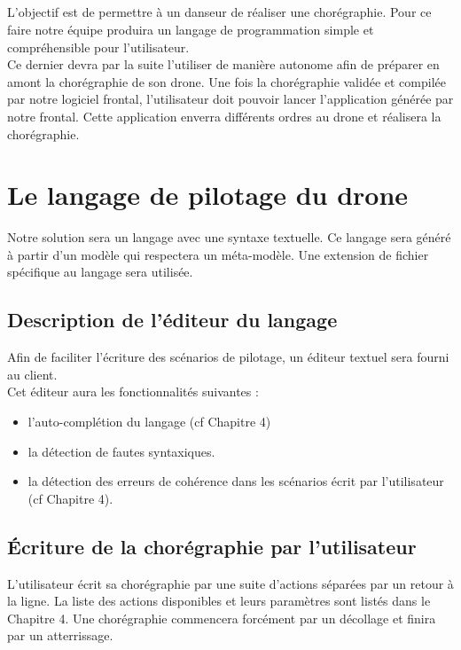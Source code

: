 \documentclass[12pt, openany]{report}
\begin{document}
\paragraph{} L'objectif est de permettre à un danseur de réaliser une chorégraphie. Pour ce faire notre équipe produira un langage de programmation simple et compréhensible pour l'utilisateur. \\Ce dernier devra par la suite l'utiliser de manière autonome afin de préparer en amont la chorégraphie de son drone. Une fois la chorégraphie validée et compilée par notre logiciel frontal, l'utilisateur doit pouvoir lancer l'application générée par notre frontal. Cette application enverra différents ordres au drone et réalisera la chorégraphie.

\chapter{Le langage de pilotage du drone}

Notre solution sera un langage avec une syntaxe textuelle. Ce langage sera généré à partir d'un modèle qui respectera un méta-modèle. Une extension de fichier spécifique au langage sera utilisée. 

\section{Description de l'éditeur du langage}

Afin de faciliter l'écriture des scénarios de pilotage, un éditeur textuel sera fourni au client.\\ Cet éditeur aura les fonctionnalités suivantes : 
\begin{itemize}
	\item l'auto-complétion du langage (cf Chapitre 4)
	\item la détection de fautes syntaxiques.
	\item la détection des erreurs de cohérence dans les scénarios écrit par l'utilisateur (cf Chapitre 4).
\end{itemize}

\section{Écriture de la chorégraphie par l'utilisateur}
L'utilisateur écrit sa chorégraphie par une suite d'actions séparées par un retour à la ligne. La liste des actions disponibles et leurs paramètres sont listés dans le Chapitre 4. Une chorégraphie commencera forcément par un décollage et finira par un atterrissage.
\end{document}
